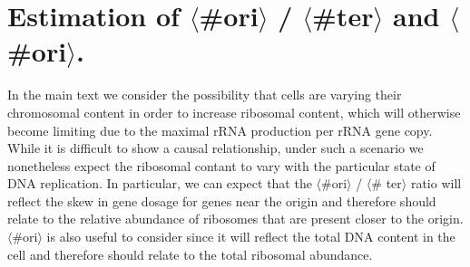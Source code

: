 \begin{figure}
    \begin{fullwidth}
\end{fullwidth}
\end{figure}

\section{Estimation of $\langle$\#ori$\rangle$ / $\langle$\#ter$\rangle$ and $\langle$\#ori$\rangle$.}

In the main text we consider the possibility that cells are varying their
chromosomal content in order to increase ribosomal content, which will otherwise
become limiting due to the maximal rRNA production per rRNA gene copy. While it is
difficult to show a causal relationship, under such a scenario we nonetheless
expect the ribosomal contant to vary with the particular state of DNA
replication. In particular, we can expect that the $\langle$\#ori$\rangle$ /
$\langle$\# ter$\rangle$ ratio will reflect the skew in gene dosage for genes
near the origin and therefore should relate to the relative abundance of
ribosomes that are present closer to the origin.  $\langle$\#ori$\rangle$ is
also useful to consider since it will reflect the total DNA content in the cell
and therefore should relate to the total ribosomal abundance.

